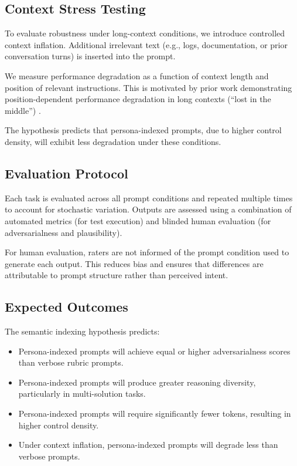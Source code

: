 \documentclass[11pt]{article}
\begin{document}
\subsection{Context Stress Testing}

To evaluate robustness under long-context conditions, we introduce controlled context inflation. Additional irrelevant text (e.g., logs, documentation, or prior conversation turns) is inserted into the prompt.

We measure performance degradation as a function of context length and position of relevant instructions. This is motivated by prior work demonstrating position-dependent performance degradation in long contexts (“lost in the middle”) \cite{liu2023lostmiddle}.

The hypothesis predicts that persona-indexed prompts, due to higher control density, will exhibit less degradation under these conditions.

\subsection{Evaluation Protocol}

Each task is evaluated across all prompt conditions and repeated multiple times to account for stochastic variation. Outputs are assessed using a combination of automated metrics (for test execution) and blinded human evaluation (for adversarialness and plausibility).

For human evaluation, raters are not informed of the prompt condition used to generate each output. This reduces bias and ensures that differences are attributable to prompt structure rather than perceived intent.

\subsection{Expected Outcomes}

The semantic indexing hypothesis predicts:

\begin{itemize}
\item Persona-indexed prompts will achieve equal or higher adversarialness scores than verbose rubric prompts.
\item Persona-indexed prompts will produce greater reasoning diversity, particularly in multi-solution tasks.
\item Persona-indexed prompts will require significantly fewer tokens, resulting in higher control density.
\item Under context inflation, persona-indexed prompts will degrade less than verbose prompts.
\end{itemize}
\end{document}
